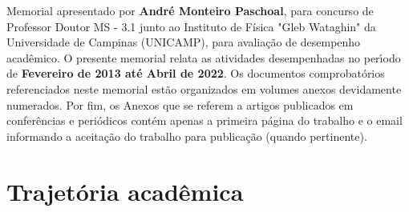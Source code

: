 \documentclass[a4paper,oneside,10pt]{article}
\newcounter{document}%
\begin{document}
\begin{onehalfspace}

Memorial apresentado por \textbf{André Monteiro Paschoal}, para concurso de Professor Doutor MS - 3.1 junto ao Instituto de Física "Gleb Wataghin" da Universidade de Campinas (UNICAMP), para avalia\c{c}\~{a}o de desempenho acad\^{e}mico.
O presente memorial relata as atividades desempenhadas no per\'{\i}odo de \textbf{Fevereiro de 2013 até Abril de 2022}. Os documentos comprobat\'{o}rios referenciados neste memorial est\~{a}o organizados em volumes anexos devidamente numerados. 
Por fim, os Anexos que se referem a artigos publicados em confer\^{e}ncias e peri\'{o}dicos cont\'{e}m apenas a primeira p\'{a}gina do trabalho e o email informando a aceita\c{c}\~{a}o do trabalho para publica\c{c}\~{a}o (quando pertinente).

\end{onehalfspace}


\newpage
\section{Trajet\'{o}ria acad\^{e}mica}
\vspace{0.3cm}
\end{document}
